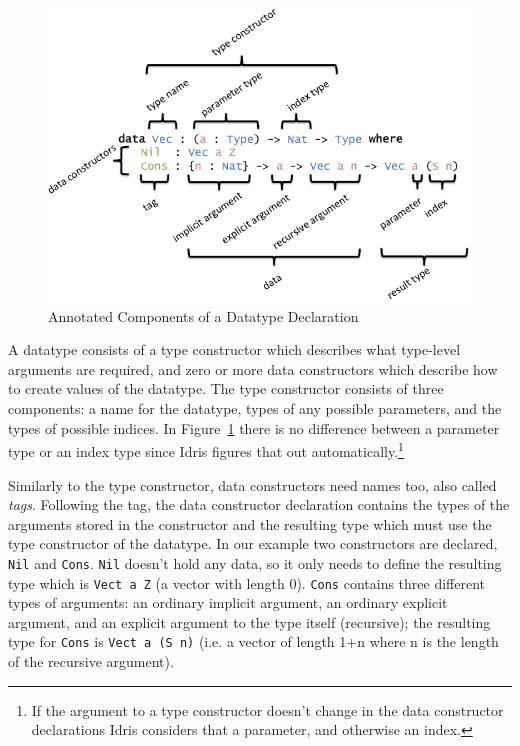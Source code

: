 \documentclass{ituthesis}
\begin{document}
\begin{figure}[ht]
\begin{center}
    \includegraphics[scale=0.5]{Figures/AnatomyOfADatatype.png}
\end{center}
\caption{Annotated Components of a Datatype Declaration}
\label{fig:anatomydatatype}
\end{figure}

A datatype consists of a type constructor which describes what type-level arguments are required, and zero or more data constructors which describe how to create values of the datatype.
The type constructor consists of three components: a name for the datatype, types of any possible parameters, and the types of possible indices.
In Figure~\ref{fig:anatomydatatype} there is no difference between a parameter type or an index type since Idris figures that out automatically.\footnote{If the argument to a type constructor doesn't change in the data constructor declarations Idris considers that a parameter, and otherwise an index.}

Similarly to the type constructor, data constructors need names too, also called \textit{tags}.
Following the tag, the data constructor declaration contains the types of the arguments stored in the constructor and the resulting type which must use the type constructor of the datatype.
In our example two constructors are declared, \texttt{Nil} and \texttt{Cons}.
\texttt{Nil} doesn't hold any data, so it only needs to define the resulting type which is \texttt{Vect a Z} (a vector with length 0).
\texttt{Cons} contains three different types of arguments: an ordinary implicit argument, an ordinary explicit argument, and an explicit argument to the type itself (recursive); the resulting type for \texttt{Cons} is \texttt{Vect a (S n)} (i.e. a vector of length 1+n where n is the length of the recursive argument).
\end{document}
